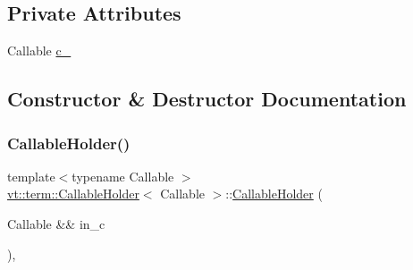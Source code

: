 \subsection*{Private Attributes}
\begin{DoxyCompactItemize}
\item 
Callable \hyperlink{structvt_1_1term_1_1_callable_holder_a8b22db3730f6ed7853b0084b9499505f}{c\+\_\+}
\end{DoxyCompactItemize}


\subsection{Constructor \& Destructor Documentation}
\mbox{\label{structvt_1_1term_1_1_callable_holder_a69d93533fc725eb0206a34e98395b7f3}} 
\subsubsection{\texorpdfstring{Callable\+Holder()}{CallableHolder()}\hspace{0.1cm}{\footnotesize\ttfamily [1/3]}}
{\footnotesize\ttfamily template$<$typename Callable $>$ \\
\hyperlink{structvt_1_1term_1_1_callable_holder}{vt\+::term\+::\+Callable\+Holder}$<$ Callable $>$\+::\hyperlink{structvt_1_1term_1_1_callable_holder}{Callable\+Holder} (\begin{DoxyParamCaption}\item[{Callable \&\&}]{in\+\_\+c }\end{DoxyParamCaption})\hspace{0.3cm}{\ttfamily [inline]}, {\ttfamily [explicit]}}

\mbox{\label{structvt_1_1term_1_1_callable_holder_a61c0e9929ff96936132fe697d6585992}} 
